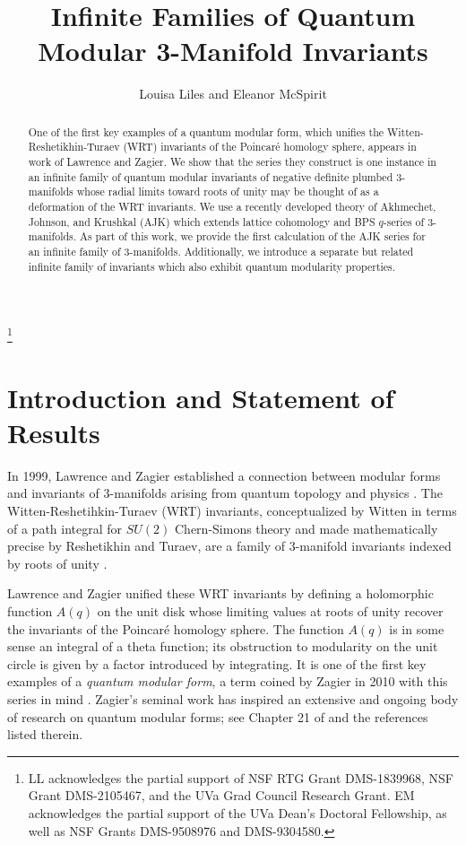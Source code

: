 \documentclass[11pt,letterpaper]{amsart}
\theoremstyle{definition}
\theoremstyle{plain}
\numberwithin{equation}{section}
\theoremstyle{example}
\begin{document}
\title{Infinite Families of Quantum Modular 3-Manifold Invariants}
\author{Louisa Liles and Eleanor McSpirit}

\address{Department of Mathematics, University of Virginia, Charlottesville VA 22904}

\thanks{LL acknowledges the partial support of NSF RTG Grant DMS-1839968, NSF Grant DMS-2105467, and the UVa Grad Council Research Grant. EM acknowledges the partial support of the UVa Dean's Doctoral Fellowship, as well as NSF Grants DMS-9508976 and DMS-9304580.}

\begin{abstract}
One of the first key examples of a quantum modular form, which unifies the Witten-Reshetikhin-Turaev (WRT) invariants of the Poincar\'e homology sphere, appears in work of Lawrence and Zagier. We show that the series they construct is one instance in an infinite family of quantum modular invariants of negative definite plumbed 3-manifolds whose radial limits toward roots of unity may be thought of as a deformation of the WRT invariants. We use a recently developed theory of Akhmechet, Johnson, and Krushkal (AJK) which extends lattice cohomology and BPS $q$-series of 3-manifolds. As part of this work, we provide the first calculation of the AJK series for an infinite family of $3$-manifolds. Additionally, we introduce a separate but related infinite family of invariants which also exhibit quantum modularity properties. 
\end{abstract}

\maketitle

\section{Introduction and Statement of Results}
In 1999, Lawrence and Zagier established a connection between modular forms and invariants of 3-manifolds arising from quantum topology and physics \cite{lawrencezagier}. The Witten-Reshetihkin-Turaev (WRT) invariants, conceptualized by Witten in terms of a path integral for $SU(2)$ Chern-Simons theory and made mathematically precise by Reshetikhin and Turaev, are a family of 3-manifold invariants indexed by roots of unity \cite{witten, R-T}.

Lawrence and Zagier unified these WRT invariants by defining a holomorphic function $A(q)$ on the unit disk whose limiting values at roots of unity recover the invariants of the Poincar\'e homology sphere. The function $A(q)$ is in some sense an integral of a theta function; its obstruction to modularity on the unit circle is given by a factor introduced by integrating. It is one of the first key examples of a \textit{quantum modular form}, a term coined by Zagier in 2010 with this series in mind \cite{zagier}. Zagier's seminal work has inspired an extensive and ongoing body of research on quantum modular forms; see Chapter 21 of \cite{harmonic} and the references listed therein.
\end{document}
